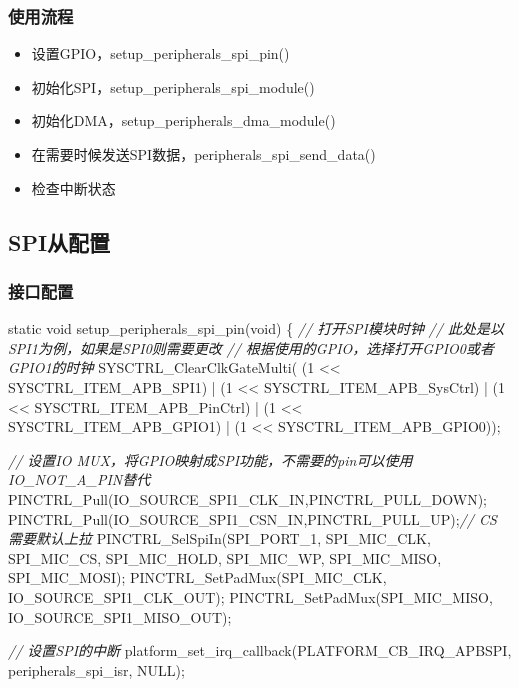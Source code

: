 \documentclass[
  12pt,
]{book}
\newenvironment{Shaded}{\begin{snugshade}}{\end{snugshade}}
\newcommand{\CommentTok}[1]{\textcolor[rgb]{0.56,0.35,0.01}{\textit{#1}}}
\newcommand{\DataTypeTok}[1]{\textcolor[rgb]{0.13,0.29,0.53}{#1}}
\newcommand{\DecValTok}[1]{\textcolor[rgb]{0.00,0.00,0.81}{#1}}
\newcommand{\NormalTok}[1]{#1}
\providecommand{\tightlist}{%
  \setlength{\itemsep}{0pt}\setlength{\parskip}{0pt}}
\begin{document}
\hypertarget{ux4f7fux7528ux6d41ux7a0b-14}{%
\subsubsection{使用流程}\label{ux4f7fux7528ux6d41ux7a0b-14}}

\begin{itemize}
\tightlist
\item
  设置GPIO，setup\_peripherals\_spi\_pin()
\item
  初始化SPI，setup\_peripherals\_spi\_module()
\item
  初始化DMA，setup\_peripherals\_dma\_module()
\item
  在需要时候发送SPI数据，peripherals\_spi\_send\_data()
\item
  检查中断状态
\end{itemize}

\hypertarget{spiux4eceux914dux7f6e-3}{%
\subsection{SPI从配置}\label{spiux4eceux914dux7f6e-3}}

\hypertarget{ux63a5ux53e3ux914dux7f6e-7}{%
\subsubsection{接口配置}\label{ux63a5ux53e3ux914dux7f6e-7}}

\begin{Shaded}
\begin{Highlighting}[]
\DataTypeTok{static} \DataTypeTok{void}\NormalTok{ setup_peripherals_spi_pin(}\DataTypeTok{void}\NormalTok{)}
\NormalTok{\{}
    \CommentTok{// 打开SPI模块时钟}
    \CommentTok{// 此处是以SPI1为例，如果是SPI0则需要更改}
    \CommentTok{// 根据使用的GPIO，选择打开GPIO0或者GPIO1的时钟}
\NormalTok{    SYSCTRL_ClearClkGateMulti(    (}\DecValTok{1}\NormalTok{ << SYSCTRL_ITEM_APB_SPI1)}
\NormalTok{                                | (}\DecValTok{1}\NormalTok{ << SYSCTRL_ITEM_APB_SysCtrl)}
\NormalTok{                                | (}\DecValTok{1}\NormalTok{ << SYSCTRL_ITEM_APB_PinCtrl)}
\NormalTok{                                | (}\DecValTok{1}\NormalTok{ << SYSCTRL_ITEM_APB_GPIO1)}
\NormalTok{                                | (}\DecValTok{1}\NormalTok{ << SYSCTRL_ITEM_APB_GPIO0));}

    \CommentTok{// 设置IO MUX，将GPIO映射成SPI功能，不需要的pin可以使用IO_NOT_A_PIN替代}
\NormalTok{    PINCTRL_Pull(IO_SOURCE_SPI1_CLK_IN,PINCTRL_PULL_DOWN);}
\NormalTok{    PINCTRL_Pull(IO_SOURCE_SPI1_CSN_IN,PINCTRL_PULL_UP);}\CommentTok{// CS 需要默认上拉}
\NormalTok{    PINCTRL_SelSpiIn(SPI_PORT_1, SPI_MIC_CLK, SPI_MIC_CS, SPI_MIC_HOLD, SPI_MIC_WP, SPI_MIC_MISO, SPI_MIC_MOSI);}
\NormalTok{    PINCTRL_SetPadMux(SPI_MIC_CLK, IO_SOURCE_SPI1_CLK_OUT);}
\NormalTok{    PINCTRL_SetPadMux(SPI_MIC_MISO, IO_SOURCE_SPI1_MISO_OUT);}
    
    \CommentTok{// 设置SPI的中断}
\NormalTok{    platform_set_irq_callback(PLATFORM_CB_IRQ_APBSPI, peripherals_spi_isr, NULL);}
\end{Highlighting}
\end{Shaded}
\end{document}
